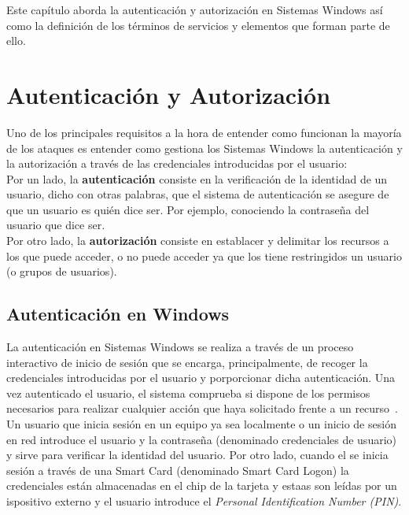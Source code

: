 Este capítulo aborda la autenticación y autorización en Sistemas Windows así como la definición de los términos de servicios y elementos que forman parte de ello.  



\section{Autenticación y Autorización}

Uno de los principales requisitos a la hora de entender como funcionan la mayoría de los ataques es entender como gestiona los Sistemas Windows la autenticación y la autorización a través de las credenciales introducidas por el usuario: \\

Por un lado, la \textbf{autenticación} consiste en la verificación de la identidad de un usuario, dicho con otras palabras, que el sistema de autenticación se asegure de que un usuario es quién dice ser. Por ejemplo, conociendo la contraseña del usuario que dice ser. \\

Por otro lado, la \textbf{autorización} consiste en establacer y delimitar los recursos a los que puede acceder, o no puede acceder ya que los tiene restringidos un usuario (o grupos de usuarios). \\

\subsection{Autenticación en Windows}

La autenticación en Sistemas Windows se realiza a través de un proceso interactivo de inicio de sesión que se encarga, principalmente, de recoger la credenciales introducidas por el usuario y porporcionar dicha autenticación. Una vez autenticado el usuario, el sistema comprueba si dispone de los permisos necesarios para realizar cualquier acción que haya solicitado frente a un recurso~\cite{capitulo2:Logon}.\\

Un usuario que inicia sesión en un equipo ya sea localmente o un inicio de sesión en red introduce el usuario y la contraseña (denominado credenciales de usuario) y sirve para verificar la identidad del usuario. Por otro lado, cuando el se inicia sesión a través de una Smart Card (denominado Smart Card Logon) la credenciales están almacenadas en el chip de la tarjeta y estaas son leídas por un ispositivo externo y el usuario introduce el {\it Personal Identification Number (PIN)}.\\

